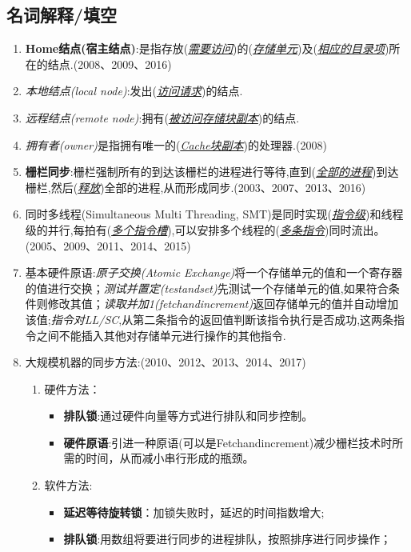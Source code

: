 \documentclass[a4paper]{ctexart}
\newcommand{\li}{\uline{\hspace{0.5em}}}
\newcommand{\blank}[1]{(\emph{\underline{#1}})}
\begin{document}
\subsection{名词解释/填空}
\begin{enumerate}
  \item \textbf{Home结点(宿主结点)}:是指存放\blank{需要访问}的\blank{存储单元}及\blank{相应的目录项}所在的结点.(2008、2009、2016)
  \item \emph{本地结点(local node)}:发出\blank{访问请求}的结点.
  \item \emph{远程结点(remote node)}:拥有\blank{被访问存储块副本}的结点.
  \item \emph{拥有者(owner)}是指拥有唯一的\blank{Cache块副本}的处理器.(2008)
  \item \textbf{栅栏同步}:栅栏强制所有的到达该栅栏的进程进行等待,直到(\emph{\underline{全部的进程}})到达栅栏,然后(\emph{\underline{释放}})全部的进程,从而形成同步.(2003、2007、2013、2016)
  \item 同时多线程(Simultaneous Multi Threading, SMT)是同时实现(\emph{\underline{指令级}})和线程级的并行,每拍有(\emph{\underline{多个指令槽}}),可以安排多个线程的(\emph{\underline{多条指令}})同时流出。(2005、2009、2011、2014、2015)
  \item 基本硬件原语:\emph{原子交换(Atomic Exchange)}将一个存储单元的值和一个寄存器的值进行交换；\emph{测试并置定(test\li and\li set)}先测试一个存储单元的值,如果符合条件则修改其值；\emph{读取并加1(fetch\li and\li increment)}返回存储单元的值并自动增加该值;\emph{指令对LL/SC},从第二条指令的返回值判断该指令执行是否成功,这两条指令之间不能插入其他对存储单元进行操作的其他指令.
  \item 大规模机器的同步方法:(2010、2012、2013、2014、2017)
  \begin{enumerate}
    \item 硬件方法：
    \begin{itemize}
      \item \textbf{排队锁}:通过硬件向量等方式进行排队和同步控制。
      \item \textbf{硬件原语}:引进一种原语(可以是Fetch\li and\li increment)减少栅栏技术时所需的时间，从而减小串行形成的瓶颈。
    \end{itemize}
    \item 软件方法:
    \begin{itemize}
      \item \textbf{延迟等待旋转锁}：加锁失败时，延迟的时间指数增大;
      \item \textbf{排队锁}:用数组将要进行同步的进程排队，按照排序进行同步操作；

\end{itemize}
\end{enumerate}
\end{enumerate}
\end{document}
